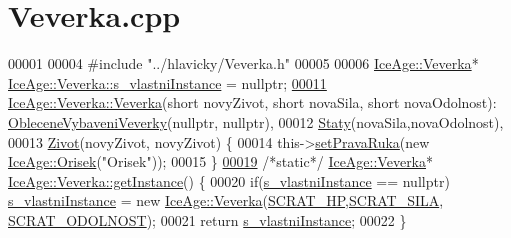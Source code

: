 \hypertarget{Veverka_8cpp_source}{}\section{Veverka.\+cpp}
\label{Veverka_8cpp_source}

\begin{DoxyCode}
00001 
00004 \textcolor{preprocessor}{#include "../hlavicky/Veverka.h"}
00005 
00006 \hyperlink{classIceAge_1_1Veverka}{IceAge::Veverka}* \hyperlink{classIceAge_1_1Veverka_acfa9aa07c2cfa881fbcc6feeb717c287}{IceAge::Veverka::s\_vlastniInstance} = \textcolor{keyword}{
      nullptr}; 
\hypertarget{Veverka_8cpp_source.tex_l00011}{}\hyperlink{classIceAge_1_1Veverka_a527c1eeb2f4a165f65ade3852719ef68}{00011} \hyperlink{classIceAge_1_1Veverka_a527c1eeb2f4a165f65ade3852719ef68}{IceAge::Veverka::Veverka}(\textcolor{keywordtype}{short} novyZivot, \textcolor{keywordtype}{short} novaSila, \textcolor{keywordtype}{short} novaOdolnost):
      \hyperlink{classIceAge_1_1ObleceneVybaveniVeverky}{ObleceneVybaveniVeverky}(nullptr, nullptr),
00012                                                 \hyperlink{classIceAge_1_1Staty}{Staty}(novaSila,novaOdolnost),
00013                                                 \hyperlink{classIceAge_1_1Zivot}{Zivot}(novyZivot, novyZivot) \{
00014     this->\hyperlink{classIceAge_1_1ObleceneVybaveniVeverky_a81c50b90cae451476735b88f3cdecb07}{setPravaRuka}(\textcolor{keyword}{new} \hyperlink{classIceAge_1_1Orisek}{IceAge::Orisek}(\textcolor{stringliteral}{"Orisek"}));
00015 \}
\hypertarget{Veverka_8cpp_source.tex_l00019}{}\hyperlink{classIceAge_1_1Veverka_a12909a7053332344e9b8c71845bb8e1f}{00019} \textcolor{comment}{/*static*/} \hyperlink{classIceAge_1_1Veverka}{IceAge::Veverka}* \hyperlink{classIceAge_1_1Veverka_a12909a7053332344e9b8c71845bb8e1f}{IceAge::Veverka::getInstance}() \{
00020     \textcolor{keywordflow}{if}(\hyperlink{classIceAge_1_1Veverka_acfa9aa07c2cfa881fbcc6feeb717c287}{s\_vlastniInstance} == \textcolor{keyword}{nullptr}) \hyperlink{classIceAge_1_1Veverka_acfa9aa07c2cfa881fbcc6feeb717c287}{s\_vlastniInstance} = \textcolor{keyword}{new} 
      \hyperlink{classIceAge_1_1Veverka}{IceAge::Veverka}(\hyperlink{Veverka_8h_a155cb6634ee33182e81d097c8795d031}{SCRAT\_HP},\hyperlink{Veverka_8h_a7e89f9c1f8405d36a24e427614e25e74}{SCRAT\_SILA},
      \hyperlink{Veverka_8h_a752d429f0ea780b8e512e8b5e5776c1b}{SCRAT\_ODOLNOST});
00021     \textcolor{keywordflow}{return} \hyperlink{classIceAge_1_1Veverka_acfa9aa07c2cfa881fbcc6feeb717c287}{s\_vlastniInstance};
00022 \}

\end{DoxyCode}
